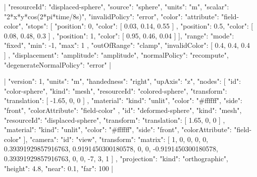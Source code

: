 \documentclass{article}
\begin{document}
|{
  "resourceId": "displaced-sphere",
  "source": "sphere",
  "units": "m",
  "scalar": "2*x*y*cos(2*pi*time/8s)",
  "invalidPolicy": "error",
  "color": {
    "attribute": "field-color",
    "stops": [
      {
        "position": 0,
        "color": [
          0.03,
          0.14,
          0.55
        ]
      },
      {
        "position": 0.5,
        "color": [
          0.08,
          0.48,
          0.3
        ]
      },
      {
        "position": 1,
        "color": [
          0.95,
          0.46,
          0.04
        ]
      }
    ],
    "range": {
      "mode": "fixed",
      "min": -1,
      "max": 1
    },
    "outOfRange": "clamp",
    "invalidColor": [
      0.4,
      0.4,
      0.4
    ]
  },
  "displacement": {
    "amplitude": "amplitude",
    "normalPolicy": "recompute",
    "degenerateNormalPolicy": "error"
  }
}|

\loomspace|{
  "version": 1,
  "units": "m",
  "handedness": "right",
  "upAxis": "z",
  "nodes": [
    {
      "id": "color-sphere",
      "kind": "mesh",
      "resourceId": "colored-sphere",
      "transform": {
        "translation": [
          -1.65,
          0,
          0
        ]
      },
      "material": {
        "kind": "unlit",
        "color": "#ffffff",
        "side": "front",
        "colorAttribute": "field-color"
      }
    },
    {
      "id": "deformed-sphere",
      "kind": "mesh",
      "resourceId": "displaced-sphere",
      "transform": {
        "translation": [
          1.65,
          0,
          0
        ]
      },
      "material": {
        "kind": "unlit",
        "color": "#ffffff",
        "side": "front",
        "colorAttribute": "field-color"
      }
    }
  ],
  "camera": {
    "id": "view",
    "transform": {
      "matrix": [
        1,
        0,
        0,
        0,
        0,
        0.39391929857916763,
        0.9191450300180578,
        0,
        0,
        -0.9191450300180578,
        0.39391929857916763,
        0,
        0,
        -7,
        3,
        1
      ]
    },
    "projection": {
      "kind": "orthographic",
      "height": 4.8,
      "near": 0.1,
      "far": 100
    }
  }
}|
\end{document}
